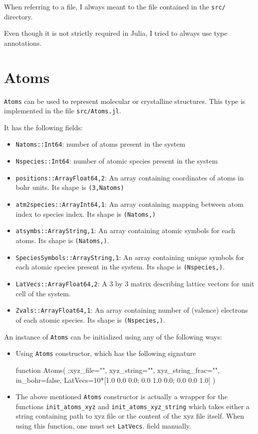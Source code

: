 \documentclass[a4paper,10pt]{paper}
\newcommand{\jlcode}[1]{\texttt{#1}}
\begin{document}
When referring to a file, I always meant to the file contained in
the \texttt{src/} directory.

Even though it is not strictly required in Julia, I tried to always use type annotations.

\section{Atoms}

\texttt{Atoms} can be used to represent molecular or crystalline structures.
This type is implemented in the file \texttt{src/Atoms.jl}.

It has the following fields:
\begin{itemize}
%
\item \jlcode{Natoms::Int64}: number of atoms present in the system
%
\item \jlcode{Nspecies::Int64}: number of atomic species present in the system
%
\item \jlcode{positions::Array{Float64,2}}: An array containing coordinates of atoms
  in bohr units. Its shape is \jlcode{(3,Natoms)}
%
\item \jlcode{atm2species::Array{Int64,1}}: An array containing mapping between atom index
  to species index. Its shape is \jlcode{(Natoms,)}
%
\item \jlcode{atsymbs::Array{String,1}}: An array containing atomic symbols for each atoms.
  Its shape is \jlcode{(Natoms,)}.
%
\item \jlcode{SpeciesSymbols::Array{String,1}}: An array containing unique symbols
  for each atomic species present in the system. Its shape is \jlcode{(Nspecies,)}.
%
\item \jlcode{LatVecs::Array{Float64,2}}: A 3 by 3 matrix describing lattice vectors for unit
  cell of the system.
%
\item \jlcode{Zvals::Array{Float64,1}}: An array containing number of (valence)
  electrons of each atomic species. Its shape is \verb|(Nspecies,)|.
\end{itemize}

An instance of \jlcode{Atoms} can be initialized using any of the following ways:

\begin{itemize}
\item Using \jlcode{Atoms} constructor, which has the following signature
%
\begin{juliacode}
function Atoms( ;xyz_file="", xyz_string="", xyz_string_frac="",
                in_bohr=false,
                LatVecs=10*[1.0 0.0 0.0; 0.0 1.0 0.0; 0.0 0.0 1.0] )
\end{juliacode}
%
\item The above mentioned \jlcode{Atoms} constructor is actually a wrapper for the functions
  \jlcode{init_atoms_xyz} and \jlcode{init_atoms_xyz_string} which takes either
  a string containing path to xyz file or the content of the xyz file
  itself. When using this function, one must set \jlcode{LatVecs}.
  field manually.
\end{itemize}
\end{document}
